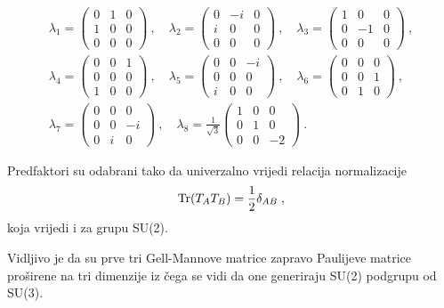 \begin{gather}
\lambda_1 = \begin{pmatrix} 0 & 1 & 0 \\ 1 & 0 & 0 \\ 0 & 0 & 0 \end{pmatrix}\:,\quad
\lambda_2 = \begin{pmatrix} 0 & -i & 0 \\ i & 0 & 0 \\ 0 & 0 & 0 \end{pmatrix}\:,\quad
\lambda_3 = \begin{pmatrix} 1 & 0 & 0 \\ 0 & -1 & 0 \\ 0 & 0 & 0 \end{pmatrix}\:, \nonumber \\[2ex]
\lambda_4 = \begin{pmatrix} 0 & 0 & 1 \\ 0 & 0 & 0 \\ 1 & 0 & 0 \end{pmatrix}\:,\quad
\lambda_5 = \begin{pmatrix} 0 & 0 & -i \\ 0 & 0 & 0 \\ i & 0 & 0 \end{pmatrix}\:,\quad
\lambda_6 = \begin{pmatrix} 0 & 0 & 0 \\ 0 & 0 & 1 \\ 0 & 1 & 0 \end{pmatrix}\:, \\[2ex]
\lambda_7 = \begin{pmatrix} 0 & 0 & 0 \\ 0 & 0 & -i \\ 0 & i & 0 \end{pmatrix}\:,\quad
\lambda_8 = \frac{1}{\sqrt{3}} \begin{pmatrix} 1 & 0 & 0 \\ 0 & 1 & 0 \\ 0 & 0 & -2 \end{pmatrix}
\:.
\nonumber
\end{gather}

Predfaktori su odabrani tako da univerzalno vrijedi relacija normalizacije
\begin{equation}
 \operatorname{Tr}(T_A T_B) = \frac{1}{2} \delta_{AB} \;,
\label{eq:SU3norm}
\end{equation}
koja vrijedi i za grupu SU(2).

Vidljivo je da su prve tri Gell-Mannove matrice zapravo Paulijeve matrice
proširene na tri dimenzije iz čega se vidi da one generiraju SU(2) podgrupu od SU(3).

